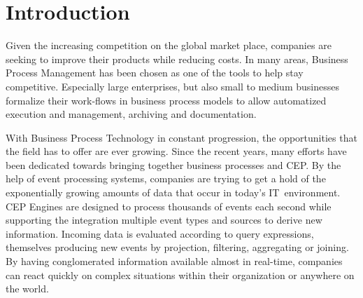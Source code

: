 \chapter{Introduction}

Given the increasing competition on the global market place, companies are seeking to improve their products while reducing costs.
In many areas, Business Process Management has been chosen as one of the tools to help stay competitive.
Especially large enterprises, but also small to medium businesses formalize their work-flows in business process models to allow automatized execution and management, archiving and documentation.

With Business Process Technology in constant progression, the opportunities that the field has to offer are ever growing.
Since the recent years, many efforts have been dedicated towards bringing together business processes and \ac{CEP}.
By the help of event processing systems, companies are trying to get a hold of the exponentially growing amounts of data that occur in today's IT~environment.
CEP Engines are designed to process thousands of events each second while supporting the integration multiple event types and sources to derive new information.
Incoming data is evaluated according to query expressions, themselves producing new events by projection, filtering, aggregating or joining.
By having conglomerated information available almost in real-time, companies can react quickly on complex situations within their organization or anywhere on the world.

